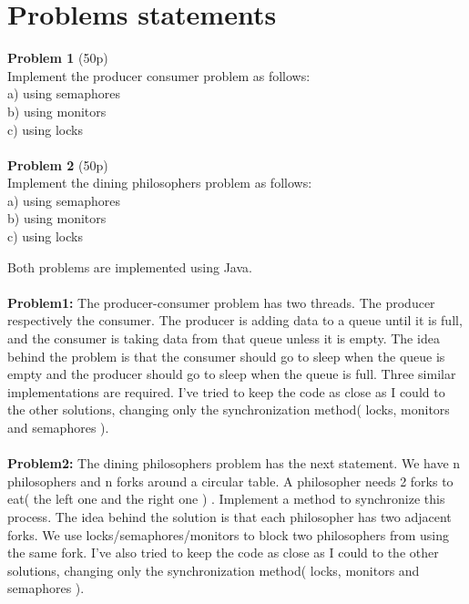 \documentclass[14pt]{article}
\begin{document}
\section*{Problems statements}
\vspace{20 mm}
\textbf{Problem 1} (50p) \\
Implement the producer consumer problem as follows:\\
a) using semaphores\\
b) using monitors\\
c) using locks
\\\vspace{10 mm}\\
\textbf{Problem 2} (50p) \\
Implement the dining philosophers problem as follows:\\
a) using semaphores\\
b) using monitors\\
c) using locks
\begin{center}
\end{center}
\newpage
Both problems are implemented using Java.
\\\vspace{10 mm}\\
\textbf{Problem1:} The producer-consumer problem has two threads. The producer respectively the consumer. The producer is adding data to a queue until it is full, and the consumer is taking data from that queue unless it is empty. The idea behind the problem is that the consumer should go to sleep when the queue is empty and the producer should go to sleep when the queue is full. Three similar implementations are required. I've tried to keep the code as close as I could to the other solutions, changing only the synchronization method( locks, monitors and semaphores ).
\\\vspace{20 mm}\\
\textbf{Problem2:} The dining philosophers problem has the next statement. We have n philosophers and n forks around a circular table. A philosopher needs 2 forks to eat( the left one and the right one ) . Implement a method to synchronize this process. The idea behind the solution is that each philosopher has two adjacent forks. We use locks/semaphores/monitors to block two philosophers from using the same fork. I've also tried to keep the code as close as I could to the other solutions, changing only the synchronization method( locks, monitors and semaphores ).
\newpage
\end{document}
